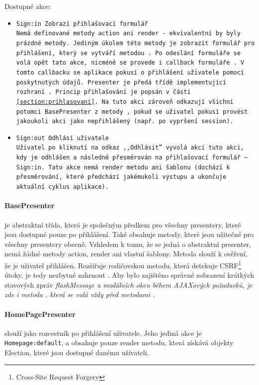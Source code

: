 Dostupné akce:
\begin{itemize}
	\item \tt{Sign:in} Zobrazí přihlašovací formulář\\
Nemá definované metody action ani render - ekvivalentní by byly prázdné metody. Jediným úkolem této metody je zobrazit formulář pro přihlášení, který se vytváří metodou . Po~odeslání formuláře se volá opět tato akce, nicméně se provede i callback formuláře . V tomto callbacku se aplikace pokusí o přihlášení uživatele pomocí poskytnutých údajů. Presenter je předá třídě implementující rozhraní . Princip přihlašování je popsán v části \ref{section:prihlasovani}. Na tuto akci zároveň odkazují všichni potomci BasePresenter z metody , pokud se uživatel pokusí provést jakoukoli akci jako nepřihlášený (např. po~vypršení session).
	\item \tt{Sign:out} Odhlásí uživatele\\
Uživatel po kliknutí na odkaz ,,Odhlásit'' vyvolá akci tuto akci, kdy je odhlášen a následně přesměrován na přihlašovací formulář -- \tt{Sign:in}. Tato akce nemá render metodu ani šablonu (dochází k přesměrování, které předchází jakémukoli výstupu a ukončuje aktuální cyklus aplikace).
\end{itemize}


\paragraph{BasePresenter} je abstraktní třída, která je společným předkem pro všechny presentery, které jsou dostupné pouze po přihlášení. Také obsahuje metody, které jsou užitečné pro všechny presentery obecně. Vzhledem k tomu, že se jedná o abstraktní presenter, nemá žádné metody action, render ani vlastní šablony. 
Metoda  slouží k ověření, že je uživatel přihlášen. Rozšiřuje rodičovskou metodu, která detekuje CSRF\footnote{Cross-Site Request Forgery} útoky, je tedy nezbytné zahrnout %
. Aby bylo zajištěno správné zobrazení krátkých stavových zpráv \it{flashMessage} a modálních oken během AJAXových požadavků, je zde i metoda , která se volá vždy před metodami .


\paragraph{HomePagePresenter} slouží jako rozcestník po přihlášení uživatele. Jeho jediná akce je \texttt{Homepage:default}, a obsahuje pouze render metodu, která získává objekty Election, které jsou dostupné danému uživateli.


